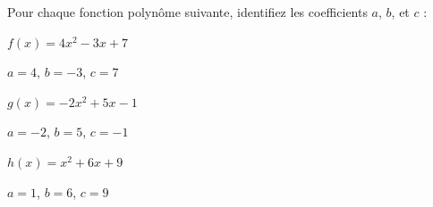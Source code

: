 \documentclass[11pt,a4paper]{article}  %
\begin{document}
	\graphicspath{{images/}}
	
	\begin{center}
		
		
	\end{center}



Pour chaque fonction polynôme suivante, identifiez les coefficients \( a \), \( b \), et \( c \) :
\begin{enumMet}
	\item \( f(x) = 4x^2 - 3x + 7 \)
	\begin{corrBox}
		$a = 4$, $b = -3$, $c = 7$	
	\end{corrBox}
	\item \( g(x) = -2x^2 + 5x - 1 \)
	\begin{corrBox}
		$a = -2$, $b = 5$, $c = -1$
	\end{corrBox}
	\item \( h(x) = x^2 + 6x + 9 \)
	\begin{corrBox}
		$a = 1$, $b = 6$, $c = 9$	
	\end{corrBox}
\end{enumMet}


\end{document}
